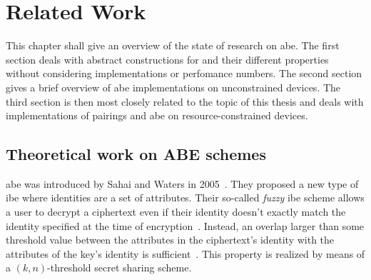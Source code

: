 \chapter{Related Work}\label{chap:related-work}

This chapter shall give an overview of the state of research on \acrlong{abe}.
The first section deals with abstract constructions for  and their different properties without considering implementations or perfomance numbers.
The second section gives a brief overview of \acrshort{abe} implementations on unconstrained devices.
The third section is then most closely related to the topic of this thesis and deals with implementations of pairings and \acrshort{abe} on resource-constrained devices.



\section{Theoretical work on ABE schemes}
\acrlong{abe} was introduced by Sahai and Waters in 2005~\cite{sahai_fuzzy_2005}.
They proposed a new type of \gls{ibe} where identities are a set of attributes.
Their so-called \emph{fuzzy} \gls{ibe} scheme allows a user to decrypt a ciphertext even if their identity doesn't exactly match the identity specified at the time of encryption~\cite{sahai_fuzzy_2005}.
Instead, an overlap larger than some threshold value between the attributes in the ciphertext's identity with the attributes of the key's identity is sufficient~\cite{sahai_fuzzy_2005}.
This property is realized by means of a $(k, n)$-threshold secret sharing scheme.


